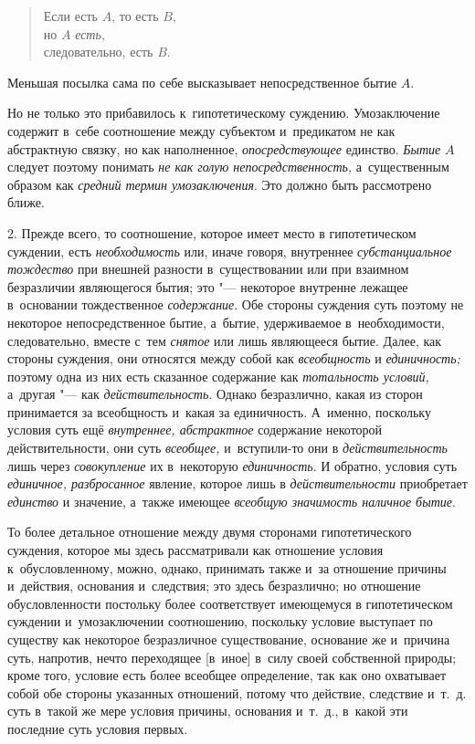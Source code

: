 \begin{verse}
Если есть $A$, то есть $B$,\\
но $A$ {\em есть,}\\
следовательно, есть $B$.
\end{verse}

Меньшая посылка сама по себе высказывает непосредственное бытие $A$.

Но не только это прибавилось к~гипотетическому суждению.
Умозаключение содержит в~себе соотношение между субъектом и~предикатом не
как абстрактную связку, но как наполненное, {\em опосредствующее}
единство. {\em Бытие} $A$ следует поэтому понимать
{\em не как голую непосредственность,} а~существенным образом как
{\em средний термин умозаключения}. Это должно быть рассмотрено ближе.

2. Прежде всего, то соотношение, которое имеет место в
гипотетическом суждении, есть {\em необходимость} или,
иначе говоря, внутреннее {\em субстанциальное тождество}
при внешней разности в~существовании или при
взаимном безразличии являющегося бытия; это "--- некоторое
внутренне лежащее в~основании тождественное {\em содержание}. Обе
стороны суждения суть поэтому не некоторое непосредственное бытие, а~бытие,
удерживаемое в~необходимости, следовательно, вместе с~тем {\em снятое} или лишь
являющееся бытие. Далее, как стороны суждения, они относятся между собой
как {\em всеобщность} и {\em единичность;}
поэтому одна из них есть сказанное содержание как
{\em тотальность условий,} а~другая "--- как {\em действительность}.
Однако безразлично, какая из сторон принимается за
всеобщность и~какая за единичность. А~именно, поскольку условия суть ещё
{\em внутреннее, абстрактное}
содержание некоторой действительности, они суть
{\em всеобщее,} и~вступили-то они в {\em действительность}
лишь через {\em совокупление} их в~некоторую {\em единичность}.
И обратно, условия суть {\em единичное, разбросанное}
явление, которое лишь в {\em действительности} приобретает {\em единство} и
значение, а~также имеющее {\em всеобщую значимость наличное бытие}.

То более детальное отношение между двумя сторонами
гипотетического суждения, которое мы здесь рассматривали как отношение
условия к~обусловленному, можно, однако, принимать также и~за отношение
причины и~действия, основания и~следствия; это здесь безразлично; но
отношение обусловленности постольку более соответствует имеющемуся в
гипотетическом суждении и~умозаключении соотношению, поскольку условие
выступает по существу как некоторое безразличное существование, основание
же и~причина суть, напротив, нечто переходящее [в~иное] в~силу своей
собственной природы; кроме того, условие есть более всеобщее определение,
так как оно охватывает собой обе стороны указанных отношений, потому что
действие, следствие и~т.~д. суть в~такой же мере условия причины, основания
и~т.~д., в~какой эти последние суть условия первых.

